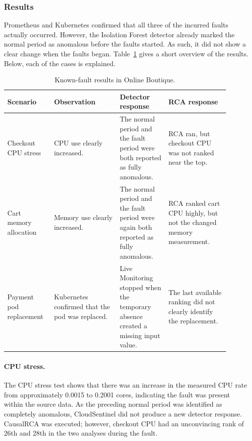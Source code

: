 \subsubsection{Results}

Prometheus and Kubernetes confirmed that all three of the incurred faults actually occurred. However, the Isolation Forest detector already marked the normal period as anomalous before the faults started. As such, it did not show a clear change when the faults began. Table~\ref{tab:h9-known-fault-results} gives a short overview of the results. Below, each of the cases is explained.

\begin{table}[H]
    \centering
    \small
    \caption{Known-fault results in Online Boutique.}
    \label{tab:h9-known-fault-results}
    \begin{tabular}{|p{0.18\linewidth}|p{0.27\linewidth}|p{0.20\linewidth}|p{0.25\linewidth}|}
        \hline
        Scenario & Observation & Detector response & RCA response \\
        \hline
        Checkout CPU stress & CPU use clearly increased. & The normal period and the fault period were both reported as fully anomalous. & RCA ran, but checkout CPU was not ranked near the top. \\
        \hline
        Cart memory allocation & Memory use clearly increased. & The normal period and the fault period were again both reported as fully anomalous. & RCA ranked cart CPU highly, but not the changed memory measurement. \\
        \hline
        Payment pod replacement & Kubernetes confirmed that the pod was replaced. & Live Monitoring stopped when the temporary absence created a missing input value. & The last available ranking did not clearly identify the replacement. \\
        \hline
    \end{tabular}
\end{table}

\paragraph{CPU stress.}
The CPU stress test shows that there was an increase in the measured CPU rate from approximately 0.0015 to 0.2001 cores, indicating the fault was present within the source data. As the preceding normal period was identified as completely anomalous, CloudSentinel did not produce a new detector response. CausalRCA was executed; however, checkout CPU had an unconvincing rank of 26th and 28th in the two analyses during the fault.

